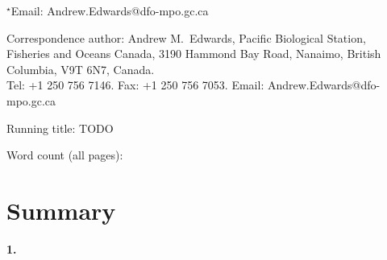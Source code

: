 \documentclass[12pt]{article}
\author{ANDREW M.~EDWARDS$^{1}$}
\date{}
\newcommand{\wordcount}{}  %
\begin{document}

\vspace{7mm}


\medskip


\noindent $^\star$Email: Andrew.Edwards@dfo-mpo.gc.ca


\medskip

\noindent Correspondence author: Andrew M.~Edwards, Pacific Biological Station,
Fisheries and Oceans Canada, 3190 Hammond Bay Road, Nanaimo, British Columbia,
V9T 6N7, Canada.\\
Tel: +1 250 756 7146. Fax: +1 250 756 7053. Email:
Andrew.Edwards@dfo-mpo.gc.ca


\medskip

\noindent Running title: TODO %
 
\medskip

\noindent Word count (all pages):   %


\clearpage

\section*{Summary}


{\bf 1.}~

\medskip

~

\medskip

~

\medskip

~


\end{document}
